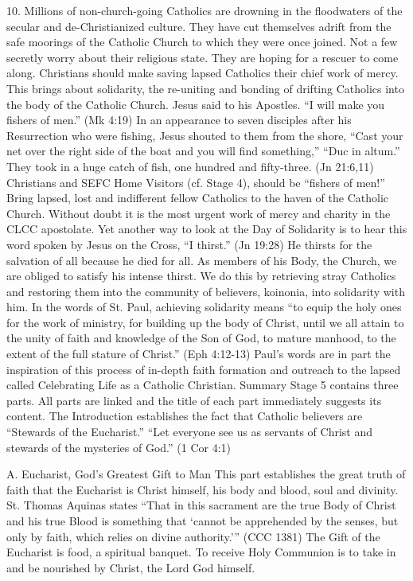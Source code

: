 \documentclass[oneside]{book}
\begin{document}
10. Millions of non-church-going Catholics are drowning in the floodwaters of
the secular and de-Christianized culture. They have cut themselves adrift from
the safe moorings of the Catholic Church to which they were once joined. Not a
few secretly worry about their religious state. They are hoping for a rescuer to
come along. Christians should make saving lapsed Catholics their chief work of
mercy. This brings about solidarity, the re-uniting and bonding of drifting
Catholics into the body of the Catholic Church. Jesus said to his Apostles. ``I
will make you fishers of men.'' (Mk 4:19) In an appearance to seven disciples
after his Resurrection who were fishing, Jesus shouted to them from the shore,
``Cast your net over the right side of the boat and you will find something,''
``Duc in altum.'' They took in a huge catch of fish, one hundred and
fifty-three. (Jn 21:6,11) Christians and SEFC Home Visitors (cf. Stage 4),
should be ``fishers of men!'' Bring lapsed, lost and indifferent fellow
Catholics to the haven of the Catholic Church. Without doubt it is the most
urgent work of mercy and charity in the CLCC apostolate.
Yet another way to look at the Day of Solidarity is to hear this word spoken by
Jesus on the Cross, ``I thirst.'' (Jn 19:28) He thirsts for the salvation of all
because he died for all. As members of his Body, the Church, we are obliged to
satisfy his intense thirst. We do this by retrieving stray Catholics and
restoring them into the community of believers, koinonia, into solidarity with
him. In the words of St. Paul, achieving solidarity means ``to equip the holy
ones for the work of ministry, for building up the body of Christ, until we all
attain to the unity of faith and knowledge of the Son of God, to mature manhood,
to the extent of the full stature of Christ.'' (Eph 4:12-13) Paul's words are in
part the inspiration of this process of in-depth faith formation and outreach to
the lapsed called Celebrating Life as a Catholic Christian.
Summary
Stage 5 contains three parts. All parts are linked and the title of each part
immediately suggests its content. The Introduction establishes the fact that
Catholic believers are ``Stewards of the Eucharist.'' ``Let everyone see us as
servants of Christ and stewards of the mysteries of God.'' (1 Cor 4:1)

A. Eucharist, God's Greatest Gift to Man
This part establishes the great truth of faith that the Eucharist is Christ
himself, his body and blood, soul and divinity. St. Thomas Aquinas states ``That
in this sacrament are the true Body of Christ and his true Blood is something
that `cannot be apprehended by the senses, but only by faith, which relies on
divine authority.''' (CCC 1381) The Gift of the Eucharist is food, a spiritual
banquet. To receive Holy Communion is to take in and be nourished by Christ, the
Lord God himself.
\end{document}
